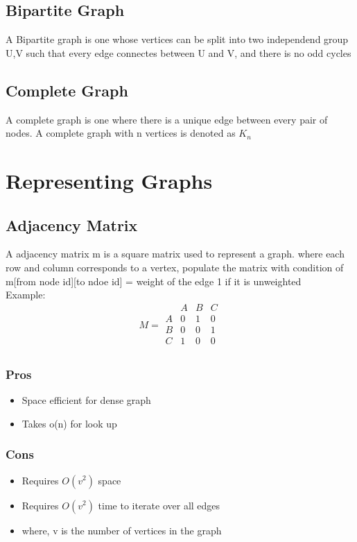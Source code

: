 \documentclass[12pt]{extarticle}
\begin{document}
\subsection{Bipartite Graph}
A Bipartite graph is one whose vertices can be split into two independend group U,V such that
every edge connectes between U and V, and there is no odd cycles

\subsection{Complete Graph}
A complete graph is one where there is a unique edge between every pair of nodes. A complete 
graph with n vertices is denoted as $K_n$

\section{Representing Graphs}

\subsection{Adjacency Matrix}
A adjacency matrix m is a square matrix used to represent a graph. where each row and column
corresponds to a vertex, populate the matrix with condition of  m[from node id][to ndoe id] =
weight of the edge 1 if it is unweighted  \\
Example: 
$$
M = 
\begin{array}{c|ccc}
    & A & B & C \\
\hline
A & 0 & 1 & 0 \\
B & 0 & 0 & 1 \\
C & 1 & 0 & 0 \\
\end{array}
$$

\subsubsection*{Pros}
\begin{itemize}
    \item Space efficient for dense graph
    \item Takes o(n) for look up
\end{itemize}

\subsubsection*{Cons}
\begin{itemize}
    \item Requires $O(v^2)$ space
    \item Requires $O(v^2)$ time to iterate over all edges
    \item where, v is the number of vertices in the graph
\end{itemize}
\end{document}
